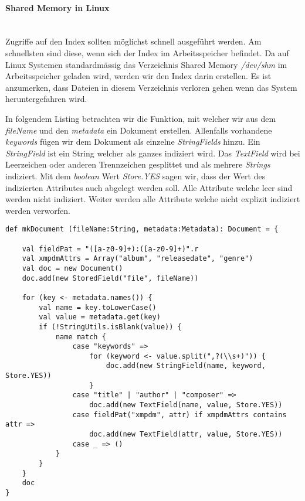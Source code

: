 \paragraph{Shared Memory in Linux} \hfill \\
Zugriffe auf den Index sollten möglichst schnell
ausgeführt werden. Am schnellsten sind diese, wenn
sich der Index im Arbeitsspeicher befindet. Da auf
Linux Systemen standardmässig das Verzeichnis
Shared Memory \emph{/dev/shm} im Arbeitsspeicher
geladen wird, werden wir den Index darin erstellen.
Es ist anzumerken, dass Dateien in diesem Verzeichnis
verloren gehen wenn das System heruntergefahren
wird.\cite{web:shm}

In folgendem Listing betrachten wir die Funktion,
mit welcher wir aus dem \emph{fileName} und den
\emph{metadata} ein Dokument erstellen. Allenfalls
vorhandene \emph{keywords} fügen wir dem Dokument als
einzelne \emph{StringFields} hinzu. Ein \emph{StringField}
ist ein String welcher als ganzes indiziert wird.
Das \emph{TextField} wird bei Leerzeichen oder anderen
Trennzeichen gesplittet und als mehrere \emph{Strings}
indiziert. Mit dem \emph{boolean} Wert \emph{Store.YES}
sagen wir, dass der Wert des indizierten Attributes
auch abgelegt werden soll. Alle Attribute welche leer
sind werden nicht indiziert. Weiter werden alle Attribute
welche nicht explizit indiziert werden verworfen.

\begin{lstlisting}[style=myScalastyle]
def mkDocument (fileName:String, metadata:Metadata): Document = {

    val fieldPat = "([a-z0-9]+):([a-z0-9]+)".r
    val xmpdmAttrs = Array("album", "releasedate", "genre")
    val doc = new Document()
    doc.add(new StoredField("file", fileName))
    
    for (key <- metadata.names()) {
        val name = key.toLowerCase()
        val value = metadata.get(key)
        if (!StringUtils.isBlank(value)) {
            name match {
                case "keywords" => 
                    for (keyword <- value.split(",?(\\s+)")) {
                        doc.add(new StringField(name, keyword, Store.YES))
                    }
                case "title" | "author" | "composer" =>
                    doc.add(new TextField(name, value, Store.YES))
                case fieldPat("xmpdm", attr) if xmpdmAttrs contains attr =>
                    doc.add(new TextField(attr, value, Store.YES))
                case _ => ()
            }
        }
    }
    doc
}
\end{lstlisting}

